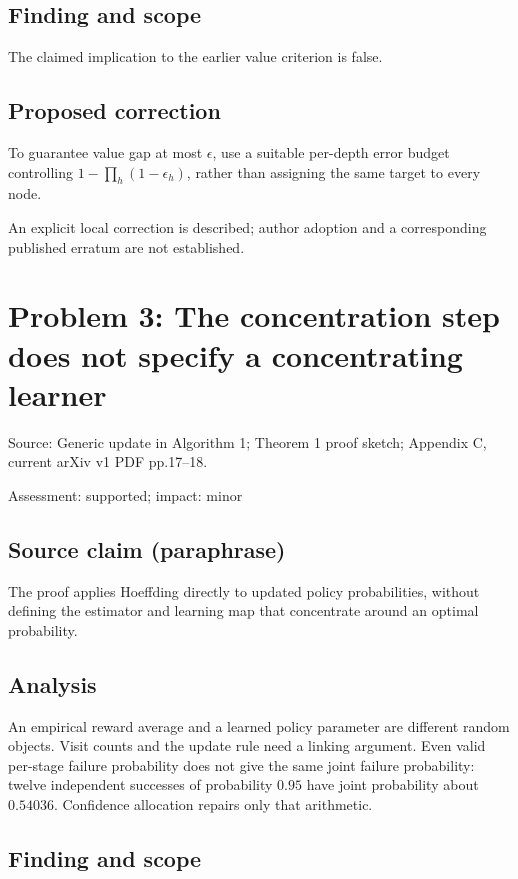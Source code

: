 \documentclass[11pt]{article}
\begin{document}
\subsection*{Finding and scope}

The claimed implication to the earlier value criterion is false.

\subsection*{Proposed correction}

To guarantee value gap at most \(\epsilon\), use a suitable per-depth error budget controlling \(1-\prod_h(1-\epsilon_h)\), rather than assigning the same target to every node.

An explicit local correction is described; author adoption and a corresponding published erratum are not established.

\section*{Problem 3: The concentration step does not specify a concentrating learner}

Source: Generic update in Algorithm 1; Theorem 1 proof sketch; Appendix C, current arXiv v1 PDF pp.17–18.

Assessment: supported; impact: minor

\subsection*{Source claim (paraphrase)}

The proof applies Hoeffding directly to updated policy probabilities, without defining the estimator and learning map that concentrate around an optimal probability.

\subsection*{Analysis}

An empirical reward average and a learned policy parameter are different random objects. Visit counts and the update rule need a linking argument. Even valid per-stage failure probability does not give the same joint failure probability: twelve independent successes of probability \(0.95\) have joint probability about \(0.54036\). Confidence allocation repairs only that arithmetic.

\subsection*{Finding and scope}
\end{document}
